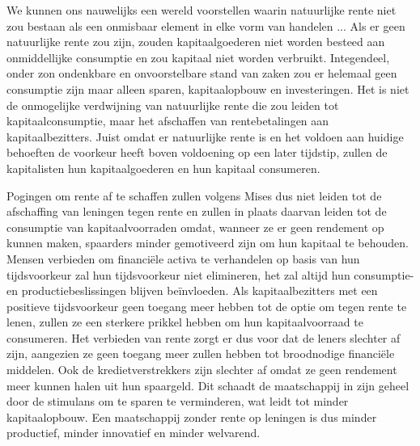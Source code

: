 \begin{blockquotebox}
We kunnen ons nauwelijks een wereld voorstellen waarin natuurlijke rente niet zou bestaan als een onmisbaar element in elke vorm van handelen ... Als er geen natuurlijke rente zou zijn, zouden kapitaalgoederen niet worden besteed aan onmiddellijke consumptie en zou kapitaal niet worden verbruikt. Integendeel, onder zo\textquotesingle n ondenkbare en onvoorstelbare stand van zaken zou er helemaal geen consumptie zijn maar alleen sparen, kapitaalopbouw en investeringen. Het is niet de onmogelijke verdwijning van natuurlijke rente die zou leiden tot kapitaalconsumptie, maar het afschaffen van rentebetalingen aan kapitaalbezitters. Juist omdat er natuurlijke rente is en het voldoen aan huidige behoeften de voorkeur heeft boven voldoening op een later tijdstip, zullen de kapitalisten hun kapitaalgoederen en hun kapitaal consumeren.\footnotemark
\end{blockquotebox}

Pogingen om rente af te schaffen zullen volgens Mises dus niet leiden tot de afschaffing van leningen tegen rente en zullen in plaats daarvan leiden tot de consumptie van kapitaalvoorraden omdat, wanneer ze er geen rendement op kunnen maken, spaarders minder gemotiveerd zijn om hun kapitaal te behouden. Mensen verbieden om financiële activa te verhandelen op basis van hun tijdsvoorkeur zal hun tijdsvoorkeur niet elimineren, het zal altijd hun consumptie- en productiebeslissingen blijven beïnvloeden. Als kapitaalbezitters met een positieve tijdsvoorkeur geen toegang meer hebben tot de optie om tegen rente te lenen, zullen ze een sterkere prikkel hebben om hun kapitaalvoorraad te consumeren. Het verbieden van rente zorgt er dus voor dat de leners slechter af zijn, aangezien ze geen toegang meer zullen hebben tot broodnodige financiële middelen. Ook de kredietverstrekkers zijn slechter af omdat ze geen rendement meer kunnen halen uit hun spaargeld. Dit schaadt de maatschappij in zijn geheel door de stimulans om te sparen te verminderen, wat leidt tot minder kapitaalopbouw. Een maatschappij zonder rente op leningen is dus minder productief, minder innovatief en minder welvarend.

